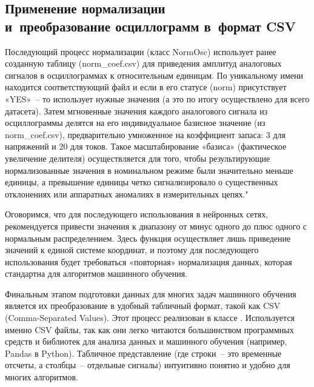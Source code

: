 \subsection[Применение нормализации и преобразование осциллограмм в формат CSV]{Применение нормализации\\ и~преобразование осциллограмм в~формат CSV}\label{sec:ch3_csv_transformation}

Последующий процесс нормализации (класс NormOsc) использует ранее созданную таблицу (norm\_coef.csv) для приведения амплитуд аналоговых сигналов в осциллограммах к относительным единицам. По уникальному имени находится соответствующий файл и если в его статусе (norm) присутствует «YES»~-- то использует нужные значения (а это по итогу осуществлено для всего датасета). Затем мгновенные значения каждого аналогового сигнала из осциллограммы делятся на его индивидуальное базисное значение (из norm\_coef.csv), предварительно умноженное на коэффициент запаса: 3 для напряжений и 20 для токов. Такое масштабирование «базиса» (фактическое увеличение делителя) осуществляется для того, чтобы результирующие нормализованные значения в номинальном режиме были значительно меньше единицы, а превышение единицы четко сигнализировало о существенных отклонениях или аппаратных аномалиях в измерительных цепях."

Оговоримся, что для последующего использования в нейронных сетях, рекомендуется привести значения к диапазону от минус одного до плюс одного с нормальным распределением. Здесь функция осуществляет лишь приведение значений к единой системе координат, и поэтому для последующего использования будет требоваться «повторная» нормализация данных, которая стандартна для алгоритмов машинного обучения.

Финальным этапом подготовки данных для многих задач машинного обучения является их преобразование в удобный табличный формат, такой как CSV (Comma-Separated Values). Этот процесс реализован в классе . Используется именно CSV файлы, так как они легко читаются большинством программных средств и библиотек для анализа данных и машинного обучения (например, Pandas в Python). Табличное представление (где строки~-- это временные отсчеты, а столбцы~-- отдельные сигналы) интуитивно понятно и удобно для многих алгоритмов.

